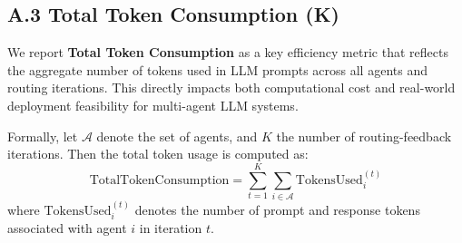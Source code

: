 




\subsection{A.3  \quad Total Token Consumption (K)}

We report \textbf{Total Token Consumption} as a key efficiency metric that reflects the aggregate number of tokens used in LLM prompts across all agents and routing iterations. This directly impacts both computational cost and real-world deployment feasibility for multi-agent LLM systems.

Formally, let $\mathcal{A}$ denote the set of agents, and $K$ the number of routing-feedback iterations. Then the total token usage is computed as:
\begin{equation}
\text{TotalTokenConsumption} = \sum_{t=1}^{K} \sum_{i \in \mathcal{A}} \text{TokensUsed}_{i}^{(t)}
\end{equation}
where $\text{TokensUsed}_{i}^{(t)}$ denotes the number of prompt and response tokens associated with agent $i$ in iteration $t$.

